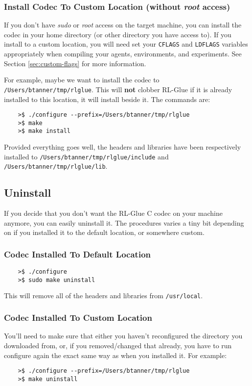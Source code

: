 \documentclass[11pt]{article}
\begin{document}
\subsubsection{Install Codec To Custom Location (without \textit{root} access)}
If you don't have \textit{sudo} or \textit{root} access on the target machine, you can install the codec in your home directory (or other directory you have access to).
If you install to a custom location, you will need set your \texttt{CFLAGS} and \texttt{LDFLAGS} variables appropriately when compiling your agents, environments, and experiments. See Section \ref{sec:custom-flags} for more information.

For example, maybe we want to install the codec to \texttt{/Users/btanner/tmp/rlglue}.  This will \textbf{not} clobber RL-Glue if it is already installed to this location, it will install beside it.  The commands are:
\begin{verbatim}
	>$ ./configure --prefix=/Users/btanner/tmp/rlglue
	>$ make
	>$ make install
\end{verbatim}

Provided everything goes well, the headers and libraries have been respectively installed to\newline
\texttt{/Users/btanner/tmp/rlglue/include} and \texttt{/Users/btanner/tmp/rlglue/lib}.


\subsection{Uninstall}
If you decide that you don't want the RL-Glue C codec on your machine anymore, you can easily uninstall it.  The procedures varies a tiny bit depending on if you installed it to the default location, or somewhere custom.

\subsubsection{Codec Installed To Default Location}
\begin{verbatim}
	>$ ./configure
	>$ sudo make uninstall
\end{verbatim}

This will remove all of the headers and libraries from \texttt{/usr/local}.

\subsubsection{Codec Installed To Custom Location}
You'll need to make sure that either you haven't reconfigured the directory you downloaded from, or, if you removed/changed that already, you have to run configure again the exact same way as when you installed it.  For example:
\begin{verbatim}
	>$ ./configure --prefix=/Users/btanner/tmp/rlglue
	>$ make uninstall
\end{verbatim}
\end{document}
